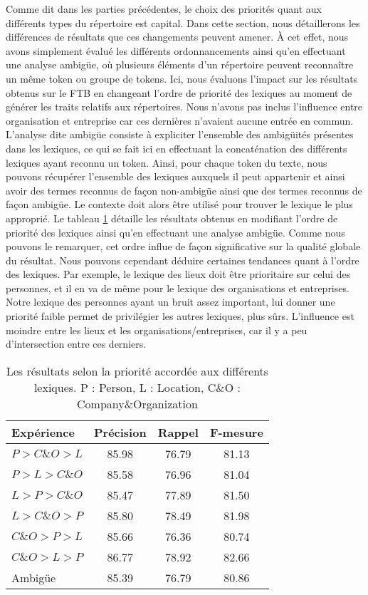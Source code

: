 \documentclass[citation\_needed]{subfiles}
\begin{document}
Comme dit dans les parties précédentes, le choix des priorités quant aux différents types du répertoire est capital. Dans cette section, nous détaillerons les différences de résultats que ces changements peuvent amener. À cet effet, nous avons simplement évalué les différents ordonnancements ainsi qu'en effectuant une analyse ambigüe, où plusieurs éléments d'un répertoire peuvent reconnaître un même token ou groupe de tokens. Ici, nous évaluons l'impact sur les résultats obtenus sur le FTB en changeant l'ordre de priorité des lexiques au moment de générer les traits relatifs aux répertoires. Nous n'avons pas inclus l'influence entre organisation et entreprise car ces dernières n'avaient aucune entrée en commun. L'analyse dite ambigüe consiste à expliciter l'ensemble des ambigüités présentes dans les lexiques, ce qui se fait ici en effectuant la concaténation des différents lexiques ayant reconnu un token. Ainsi, pour chaque token du texte, nous pouvons récupérer l'ensemble des lexiques auxquels il peut appartenir et ainsi avoir des termes reconnus de façon non-ambigüe ainsi que des termes reconnus de façon ambigüe. Le contexte doit alors être utilisé pour trouver le lexique le plus approprié. Le tableau \ref{tab:results-ftb-priority} détaille les résultats obtenus en modifiant l'ordre de priorité des lexiques ainsi qu'en effectuant une analyse ambigüe. Comme nous pouvons le remarquer, cet ordre influe de façon significative sur la qualité globale du résultat. Nous pouvons cependant déduire certaines tendances quant à l'ordre des lexiques. Par exemple, le lexique des lieux doit être prioritaire sur celui des personnes, et il en va de même pour le lexique des organisations et entreprises. Notre lexique des personnes ayant un bruit assez important, lui donner une priorité faible permet de privilégier les autres lexiques, plus sûrs. L'influence est moindre entre les lieux et les organisations/entreprises, car il y a peu d'intersection entre ces derniers.

\begin{table}[ht!]
\centering
\begin{tabular}{|l|c|c|c|}
\hline
Expérience   & Précision & Rappel & F-mesure \\
\hline
$P > C\&O > L$ & 85.98     & 76.79  & 81.13 \\
$P > L > C\&O$ & 85.58     & 76.96  & 81.04 \\
$L > P > C\&O$ & 85.47     & 77.89  & 81.50 \\
$L > C\&O > P$ & 85.80     & 78.49  & 81.98 \\
$C\&O > P > L$ & 85.66     & 76.36  & 80.74 \\
$C\&O > L > P$ & 86.77     & 78.92  & 82.66 \\
\hline
Ambigüe      & 85.39     & 76.79  & 80.86 \\
\hline
\end{tabular}
\caption{Les résultats selon la priorité accordée aux différents lexiques. P : Person, L : Location, C\&O : Company\&Organization}
\label{tab:results-ftb-priority}
\end{table}
\end{document}
